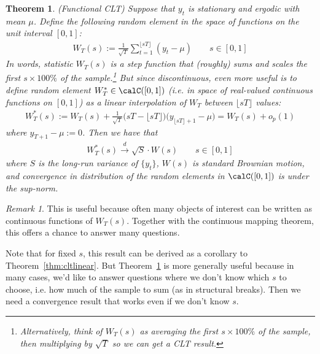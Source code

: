 \documentclass[12pt]{article}
\theoremstyle{plain}
\newtheorem{thm}{Theorem}[section]
\theoremstyle{definition}
\theoremstyle{remark}
\newtheorem*{rmk}{Remark}
\newcommand{\dto}{\xrightarrow{d}}
\begin{document}
\clearpage
\begin{thm}\emph{(Functional CLT)}
\label{thm:fclt}
Suppose that $y_t$ is stationary and ergodic with mean $\mu$.
Define the following random element in the space of functions on the
unit interval $[0,1]$:
\begin{align*}
  W_T(s) :=
  \frac{1}{\sqrt{T}}
  \sum_{t=1}^{\lfloor s T\rfloor}
  (y_t-\mu)
  \qquad
  s\in [0,1]
\end{align*}
In words, statistic $W_T(s)$ is a step function that (roughly) sums and
scales the first $s\times 100\%$ of the sample.\footnote{%
  Alternatively, think of $W_T(s)$ as \emph{averaging} the first
  $s\times 100\%$ of the sample, then multiplying by $\sqrt{T}$ so we
  can get a CLT result.
}
But since discontinuous, even more useful is to define random element
$W_T^*\in \calC([0,1])$ (i.e. in space of real-valued continuous
functions on $[0,1]$) as a linear interpolation of $W_T$ between
$\lfloor sT\rfloor$ values:
\begin{align*}
  W_T^*(s) :=
  W_T(s)
  +
  \frac{1}{\sqrt{T}}
  \big(sT -\lfloor sT\rfloor\big)
  \big(y_{\lfloor sT\rfloor+1}-\mu\big)
  = W_T(s) + o_p(1)
\end{align*}
where $y_{T+1}-\mu:=0$.
Then we have that
\begin{align*}
  W_T^*(s)
  \dto \sqrt{S}\cdot W(s)
  \qquad
  s\in [0,1]
\end{align*}
where $S$ is the long-run variance of $\{y_t\}$, $W(s)$ is standard
Brownian motion, and convergence in distribution of the random elements
in $\calC([0,1])$ is under the sup-norm.
\end{thm}
\begin{rmk}
This is useful because often many objects of interest can be written as
continuous functions of $W_T(s)$. Together with the continuous mapping
theorem, this offers a chance to answer many questions.

Note that for fixed $s$, this result can be derived as a corollary to
Theorem~\ref{thm:cltlinear}. But Theorem~\ref{thm:fclt} is more
generally useful because in many cases, we'd like to answer questions
where we don't know which $s$ to choose, i.e. how much of the sample to
sum (as in structural breaks). Then we need a convergence result that
works even if we don't know $s$.
\end{rmk}
\end{document}
